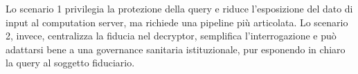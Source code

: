 Lo scenario 1 privilegia la protezione della query e riduce l'esposizione del dato di input al computation server, ma richiede una pipeline pi\`u articolata. Lo scenario 2, invece, centralizza la fiducia nel decryptor, semplifica l'interrogazione e pu\`o adattarsi bene a una governance sanitaria istituzionale, pur esponendo in chiaro la query al soggetto fiduciario.
